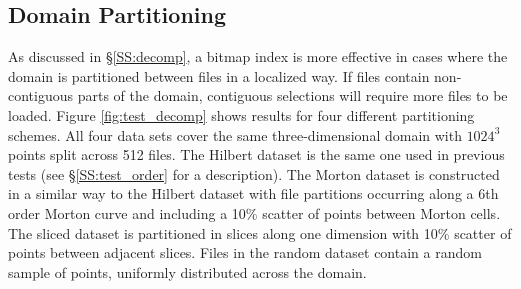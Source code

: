 \documentclass[apjl]{emulateapj}
\begin{document}
\subsection{Domain Partitioning}\label{SS:test_decomp}
%
As discussed in \S\ref{SS:decomp}, a bitmap index is more effective in cases where the domain is partitioned between files in a localized way. If files contain non-contiguous parts of the domain, contiguous selections will require more files to be loaded. Figure \ref{fig:test_decomp} shows results for four different partitioning schemes. All four data sets cover the same three-dimensional domain with $1024^3$ points split across 512 files. The Hilbert dataset is the same one used in previous tests (see \S\ref{SS:test_order} for a description). The Morton dataset is constructed in a similar way to the Hilbert dataset with file partitions occurring along a 6th order Morton curve and including a 10\% scatter of points between Morton cells. The sliced dataset is partitioned in slices along one dimension with 10\% scatter of points between adjacent slices. Files in the random dataset contain a random sample of points, uniformly distributed across the domain.
%
\end{document}

